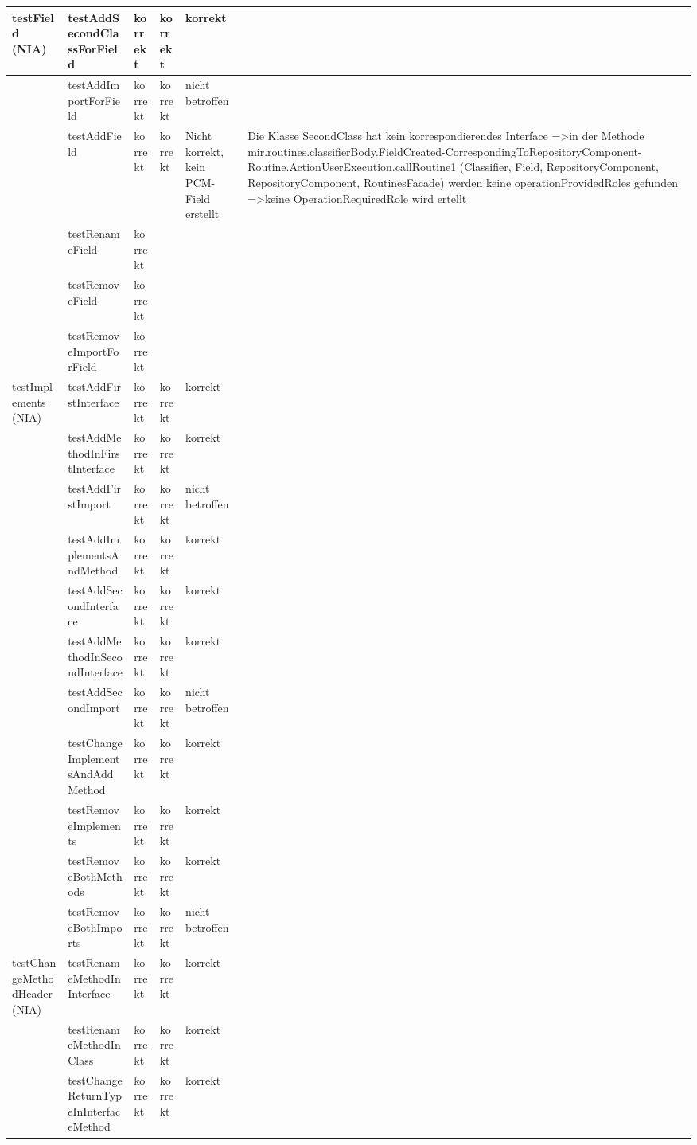 \begin{tiny}
\begin{longtable}[c]{|p{2.2cm}|p{3.5cm}|p{1cm}|p{1cm}|p{1cm}|p{4cm}|}
testField 			(NIA) & testAddSecondClassForField & korrekt & korrekt & korrekt &  \\ \hline
 & testAddImportForField & korrekt & korrekt & nicht 			betroffen &  \\ \hline
 & testAddField & korrekt & korrekt & Nicht 			korrekt, kein PCM-Field erstellt & Die 			Klasse SecondClass hat kein korrespondierendes Interface =\textgreater in 			der Methode  			mir.routines.classifierBody.FieldCreated-CorrespondingToRepositoryComponent-Routine.ActionUserExecution.callRoutine1 (Classifier, 			Field, RepositoryComponent, RepositoryComponent, RoutinesFacade) 			werden keine operationProvidedRoles 			gefunden =\textgreater keine OperationRequiredRole wird ertellt \\ \hline
 & testRenameField & korrekt &  &  &  \\ \hline
 & testRemoveField & korrekt &  &  &  \\ \hline
 & testRemoveImportForField & korrekt &  &  &  \\ \hline
testImplements 			(NIA) & testAddFirstInterface & korrekt & korrekt & korrekt &  \\ \hline
 & testAddMethodInFirstInterface & korrekt & korrekt & korrekt &  \\ \hline
 & testAddFirstImport & korrekt & korrekt & nicht 			betroffen &  \\ \hline
 & testAddImplementsAndMethod & korrekt & korrekt & korrekt &  \\ \hline
 & testAddSecondInterface & korrekt & korrekt & korrekt &  \\ \hline
 & testAddMethodInSecondInterface & korrekt & korrekt & korrekt &  \\ \hline
 & testAddSecondImport & korrekt & korrekt & nicht 			betroffen &  \\ \hline
 & testChangeImplementsAndAddMethod & korrekt & korrekt & korrekt &  \\ \hline
 & testRemoveImplements & korrekt & korrekt & korrekt &  \\ \hline
 & testRemoveBothMethods & korrekt & korrekt & korrekt &  \\ \hline
 & testRemoveBothImports & korrekt & korrekt & nicht 			betroffen &  \\ \hline
testChangeMethodHeader 			(NIA) & testRenameMethodInInterface & korrekt & korrekt & korrekt &  \\ \hline
 & testRenameMethodInClass & korrekt & korrekt & korrekt &  \\ \hline
 & testChangeReturnTypeInInterfaceMethod & korrekt & korrekt & korrekt &  \\ \hline

\end{longtable}
\end{tiny}
